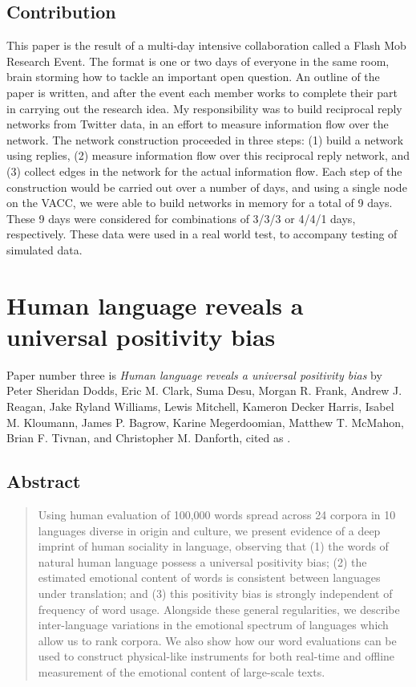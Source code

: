\subsection{Contribution}

This paper is the result of a multi-day intensive collaboration called a Flash Mob Research Event.
The format is one or two days of everyone in the same room, brain storming how to tackle an important open question.
An outline of the paper is written, and after the event each member works to complete their part in carrying out the research idea.
My responsibility was to build reciprocal reply networks from Twitter data, in an effort to measure information flow over the network.
The network construction proceeded in three steps: (1) build a network using replies, (2) measure information flow over this reciprocal reply network, and (3) collect edges in the network for the actual information flow.
Each step of the construction would be carried out over a number of days, and using a single node on the VACC, we were able to build networks in memory for a total of 9 days.
These 9 days were considered for combinations of 3/3/3 or 4/4/1 days, respectively.
These data were used in a real world test, to accompany testing of simulated data.

\section{Human language reveals a universal positivity bias}

Paper number three is \textit{Human language reveals a universal positivity bias} by Peter Sheridan Dodds, Eric M. Clark, Suma Desu, Morgan R. Frank, Andrew J. Reagan, Jake Ryland Williams, Lewis Mitchell, Kameron Decker Harris, Isabel M. Kloumann, James P. Bagrow, Karine Megerdoomian, Matthew T. McMahon, Brian F. Tivnan, and Christopher M. Danforth, cited as \cite{dodds2015human}.

\subsection{Abstract}
\begin{quote}
  Using human evaluation of 100,000 words spread across 24 corpora in 10 languages diverse in origin and culture, we present evidence of a deep imprint of human sociality in language, observing that
  (1) the words of natural human language possess a universal positivity bias;
  (2) the estimated emotional content of words is consistent between languages under translation;
  and (3) this positivity bias is strongly independent of frequency of word usage.
  Alongside these general regularities, we describe inter-language variations in the emotional spectrum of languages which allow us to rank corpora.
We also show how our word evaluations can be used to construct physical-like instruments for both real-time and offline measurement of the emotional content of large-scale texts.
\end{quote}

